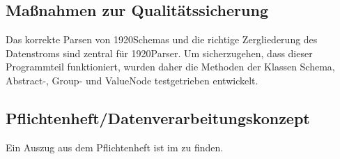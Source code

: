 \subsection{Maßnahmen zur Qualitätssicherung}
\label{sec:Qualitaetssicherung}
Das korrekte Parsen von 1920Schemas und die richtige Zergliederung des Datenstroms sind zentral für 1920Parser. Um sicherzugehen, dass dieser Programmteil funktioniert,  wurden daher die Methoden der Klassen Schema, Abstract-, Group- und ValueNode  testgetrieben entwickelt.

\subsection{Pflichtenheft/Datenverarbeitungskonzept}
\label{sec:Pflichtenheft}
Ein Auszug aus dem Pflichtenheft ist im  zu finden.


